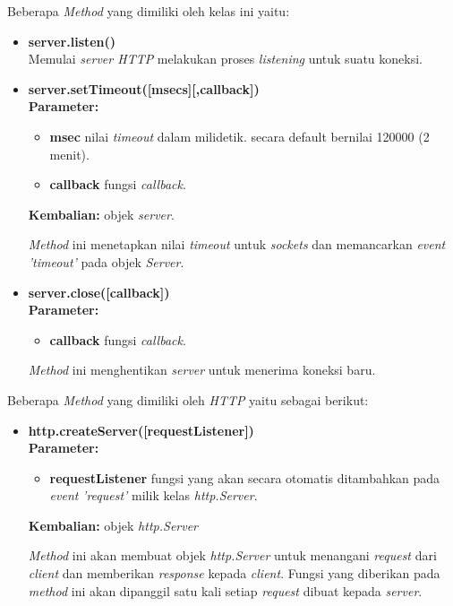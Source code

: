 \documentclass[a4paper,twoside]{article}
\begin{document}
\begin{enumerate}
\begin{enumerate}
\begin{itemize}
				Beberapa \textit{Method} yang dimiliki oleh kelas ini yaitu:
				\begin{itemize}
					\item \textbf{server.listen()} \\ Memulai \textit{server HTTP} melakukan proses \textit{listening} untuk suatu koneksi.
					
					\item \textbf{server.setTimeout([msecs][,callback])} \\ \textbf{Parameter:}
					\begin{itemize}
						\item \textbf{msec} nilai \textit{timeout} dalam milidetik. secara default bernilai 120000 (2 menit).
						\item \textbf{callback} fungsi \textit{callback}.
					\end{itemize}
					\textbf{Kembalian:} objek \textit{server}.
					
					\textit{Method} ini menetapkan nilai \textit{timeout} untuk \textit{sockets} dan memancarkan \textit{event 'timeout'} pada objek \textit{Server}.
					
					\item \textbf{server.close([callback])} \\ \textbf{Parameter:}
					\begin{itemize}
						\item \textbf{callback} fungsi \textit{callback}.
					\end{itemize} 
					
					\textit{Method} ini menghentikan \textit{server} untuk menerima koneksi baru.
				\end{itemize}
			\end{itemize} 
			
			Beberapa \textit{Method} yang dimiliki oleh \textit{HTTP} yaitu sebagai berikut:
			\begin{itemize}
				\item \textbf{http.createServer([requestListener])} \\ \textbf{Parameter:}
				\begin{itemize}
					\item \textbf{requestListener} fungsi yang akan secara otomatis ditambahkan pada \textit{event} \textit{'request'} milik kelas \textit{http.Server}.
				\end{itemize}
				\textbf{Kembalian:} objek \textit{http.Server}
				
				\textit{Method} ini akan membuat objek \textit{http.Server} untuk menangani \textit{request} dari \textit{client} dan memberikan \textit{response} kepada \textit{client}. Fungsi yang diberikan pada \textit{method} ini akan dipanggil satu kali setiap \textit{request} dibuat kepada \textit{server}.
				

\end{itemize}
\end{enumerate}
\end{enumerate}
\end{document}
